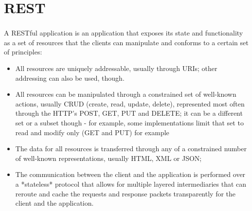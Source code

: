 \documentclass[a4paper,10pt,xcolor=pdftex,dvipsnames,table]{beamer}
\begin{document}
\section{REST}
\begin{frame}[t]\frametitle{\insertsection{}}
        \note{}
        \begin{block}{A RESTful application}
          is an application that exposes its state and functionality as a set of resources that the clients can manipulate and conforms to a certain set of principles:
          \begin{itemize}[<+->]
          \item All resources are uniquely addressable, usually through URIs; other addressing can also be used, though.
          \item All resources can be manipulated through a constrained set of well-known actions, usually CRUD (create, read, update,
            delete), represented most often through the HTTP's POST, GET, PUT and DELETE; it can be a different set or a subset
            though - for example, some implementations limit that set to read and modify only (GET and PUT) for example
          \item The data for all resources is transferred through any of a constrained number of well-known representations, usually HTML, XML or JSON;
          \item The communication between the client and the application is performed over a *stateless* protocol that allows for
            multiple layered intermediaries that can reroute and cache the requests and response packets transparently for the
            client and the application.
          \end{itemize}
        \end{block}
        \begin{center}
        \end{center}
\end{frame}
\end{document}
